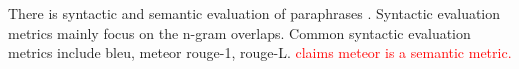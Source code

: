 There is syntactic and semantic evaluation of paraphrases \citep{gohsen_captions_2023}.
Syntactic evaluation metrics mainly focus on the n-gram overlaps. %
Common syntactic evaluation metrics include \ac{bleu}, \ac{meteor} \ac{rouge}-1, \ac{rouge}-L.
\textcolor{red}{\citet{kurt_pehlivanoglu_comparative_2024} claims \ac{meteor} is a semantic metric.}




